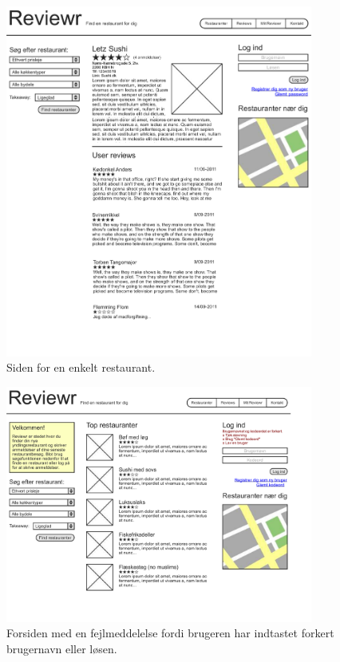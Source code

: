 \documentclass[a4paper, 12pt]{article}
\begin{document}
\begin{figure}[hp]
  \centering
  \includegraphics[width=0.9\textwidth]{mockup/page3.pdf}
  \caption{Siden for en enkelt restaurant.}
\end{figure}

\begin{figure}[hp]
  \centering
  \includegraphics[width=0.9\textwidth]{mockup/page4.pdf}
  \caption{Forsiden med en fejlmeddelelse fordi brugeren har indtastet
    forkert brugernavn eller løsen.}
\end{figure}
\end{document}
